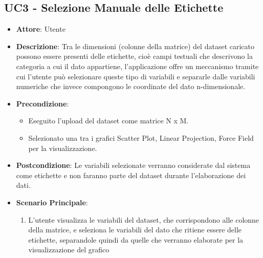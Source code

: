 \subsection{UC3 - Selezione Manuale delle Etichette}
    
    \begin{itemize}
    \item \textbf{Attore}: Utente
    \item \textbf{Descrizione}: Tra le dimensioni (colonne della matrice) del dataset caricato possono essere presenti delle etichette, cioè campi testuali che descrivono la categoria a cui il dato appartiene, l'applicazione offre un meccanismo tramite cui l'utente può selezionare queste tipo di variabili e separarle dalle variabili numeriche che invece compongono le coordinate del dato n-dimensionale.
    \item \textbf{Precondizione}:
    \begin{itemize}
        \item Eseguito l'upload del dataset come matrice N x M.
        \item Selezionato una tra i grafici Scatter Plot, Linear Projection, Force Field per la visualizzazione.
    \end{itemize}
    \item \textbf{Postcondizione}: Le variabili selezionate verranno considerate dal sistema come etichette e non faranno parte del dataset durante l'elaborazione dei dati.
    \item \textbf{Scenario Principale}: 
    \begin{enumerate}
        \item L'utente visualizza le variabili del dataset, che corrispondono alle colonne della matrice, e seleziona le variabili del dato che ritiene essere delle etichette, separandole quindi da quelle che verranno elaborate per la visualizzazione del grafico
    \end{enumerate}  
    \end{itemize}
    
